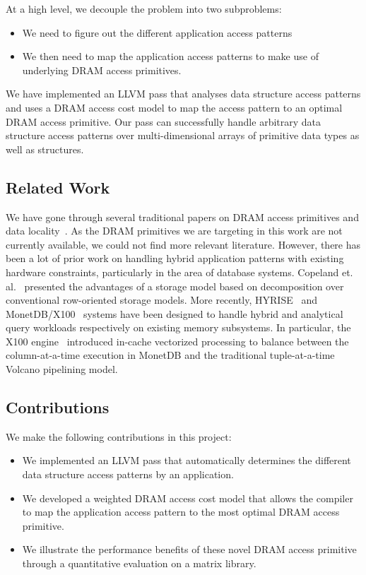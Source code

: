\documentclass[letterpaper]{article}
\begin{document}
At a high level, we decouple the problem into two subproblems:

\begin{itemize}
  \item {We need to figure out the different application access patterns}
  \item {We then need to map the application access patterns to make use of
  underlying DRAM access primitives.}
\end{itemize}

We have implemented an LLVM pass that analyses data structure access patterns
and uses a DRAM access cost model to map the access pattern to an optimal DRAM
access primitive.
Our pass can successfully handle arbitrary data structure access patterns
over multi-dimensional arrays of primitive data types as well as structures.

\subsection{Related Work}

We have gone through several traditional papers on DRAM access
primitives and data locality~\cite{dram1,dram2,dram3}.
As the DRAM primitives we are targeting in this work are not currently
available, we could not find more relevant literature.
However, there has been a lot of prior work on handling hybrid application
patterns with existing hardware constraints, particularly in the
area of database systems.
Copeland et. al.~\cite{Copeland85} presented the advantages of a storage model
based on decomposition over conventional row-oriented storage models.
More recently, HYRISE~\cite{grund10} and MonetDB/X100~\cite{monetdb} systems 
have been designed to handle hybrid and analytical query workloads respectively
on existing memory subsystems.
In particular, the X100 engine~\cite{Zukowski05} introduced in-cache vectorized 
processing to balance between the column-at-a-time execution in MonetDB and the
traditional tuple-at-a-time Volcano pipelining model.

\subsection{Contributions}

We make the following contributions in this project:

\begin{itemize}
  \item {We implemented an LLVM pass that automatically determines the different
  data structure access patterns by an application.}
  \item {We developed a weighted DRAM access cost model that allows the compiler
  to map the application access pattern to the most optimal DRAM access
  primitive.}
  \item {We illustrate the performance benefits of these novel DRAM access primitive
  through a quantitative evaluation on a matrix library.}
\end{itemize}
\end{document}
